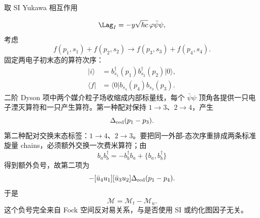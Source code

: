 \begin{derivation}
取 SI Yukawa 相互作用

\begin{equation*}
 \Lag_I=-y\sqrt{\hbar c}\,\varphi\bar\psi\psi,
\end{equation*}
考虑
\begin{equation*}
 f(p_1,s_1)+f(p_2,s_2)
 \to
 f(p_3,s_3)+f(p_4,s_4).
\end{equation*}
固定两电子初末态的算符次序：
\begin{align*}
 |i\rangle
 &=b_{s_1}^\dagger(p_1)b_{s_2}^\dagger(p_2)|0\rangle,\\
 \langle f|
 &=\langle0|b_{s_4}(p_4)b_{s_3}(p_3).
\end{align*}
二阶 Dyson 项中两个媒介粒子场收缩成内部标量线，每个 $\bar\psi\psi$ 顶角各提供一只电子湮灭算符和一只产生算符。第一种配对保持 $1\to3$、$2\to4$，产生
\begin{equation*}
 [\bar u_3u_1][\bar u_4u_2]
 \Delta_{\rm red}(p_1-p_3).
\end{equation*}
第二种配对交换末态标签：$1\to4$、$2\to3$。要把同一外部-态次序重排成两条标准旋量 chains，必须额外交换一次费米算符；由
\begin{equation*}
 b_a b_b^\dagger
 =-b_b^\dagger b_a+\{b_a,b_b^\dagger\}
\end{equation*}
得到额外负号，故第二项为
\begin{equation*}
 -[\bar u_4u_1][\bar u_3u_2]
 \Delta_{\rm red}(p_1-p_4).
\end{equation*}
于是
\begin{equation*}
 {\mathcal M=\mathcal M_t-\mathcal M_u.}
\end{equation*}
这个负号完全来自 Fock 空间反对易关系，与是否使用 SI 或约化图因子无关。
\end{derivation}

